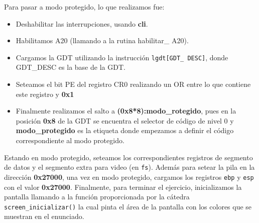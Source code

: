 Para pasar a modo protegido, lo que realizamos fue:
\begin{itemize}
	\item Deshabilitar las interrupciones, usando \textbf{cli}.
	\item Habilitamos A20 (llamando a la rutina habilitar\_ A20).
	\item Cargamos la GDT utilizando la instrucción \texttt{lgdt[GDT\_ DESC]}, donde GDT\_DESC es la base de la GDT.
	\item Seteamos el bit PE del registro CR0 realizando un OR entre lo que contiene este registro y \textbf{0x1}
	\item Finalmente realizamos el salto a \textbf{(0x8*8):modo\_rotegido}, pues en la posición \textbf{0x8} de la GDT se encuentra el selector de código de nivel 0 y \textbf{modo\_protegido} es la etiqueta donde empezamos a definir el código correspondiente al modo protegido.
\end{itemize}
Estando en modo protegido, seteamos los correspondientes registros de segmento de datos y el segmento
extra para video (en \texttt{fs}). Además para setear la pila en la dirección \textbf{0x27000}, una vez en modo protegido, cargamos los registros \texttt{ebp} y \texttt{esp} con el valor \textbf{0x27000}.
Finalmente, para terminar el ejercicio, inicializamos la pantalla llamando a la función proporcionada por la cátedra \texttt{screen\_inicializar()} la cual pinta el área de la pantalla con los colores que se muestran en el enunciado.